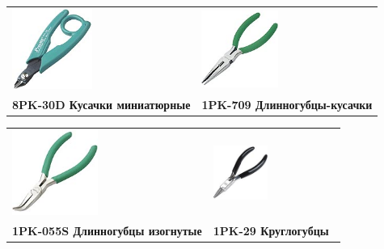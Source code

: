 \begin{tabular}{p{} p{}}
\noindent\includegraphics[width=0.45\textwidth]{tech/tools/proskit/8PK-30D.jpg}
&
\noindent\includegraphics[width=0.45\textwidth]{tech/tools/proskit/1PK-709.jpg}
\\
\textbf{8PK-30D Кусачки миниатюрные}
&
\textbf{1PK-709 Длинногубцы-кусачки}
\\
\end{tabular}
\clearpage

\begin{tabular}{p{} p{}}
\noindent\includegraphics[width=0.45\textwidth]{tech/tools/proskit/1PK-055S.jpg}
&
\noindent\includegraphics[width=0.45\textwidth]{tech/tools/proskit/1PK-29.jpg}
\\
\textbf{1PK-055S Длинногубцы изогнутые}
&
\textbf{1PK-29 Круглогубцы}
\\
\end{tabular}
\clearpage

